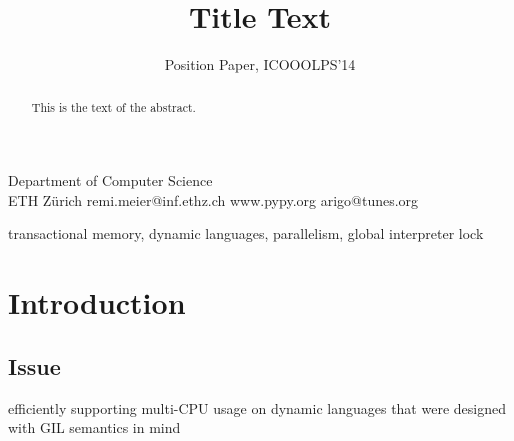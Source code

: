 \documentclass{sigplanconf}
\begin{document}
\setlength{\pdfpageheight}{\paperheight}
\setlength{\pdfpagewidth}{\paperwidth}






\title{Title Text}
\subtitle{Position Paper, ICOOOLPS'14}

           {Department of Computer Science\\ ETH Zürich}
           {remi.meier@inf.ethz.ch}
           {www.pypy.org}
           {arigo@tunes.org}

\maketitle

\begin{abstract}
This is the text of the abstract.
\end{abstract}



\keywords
transactional memory, dynamic languages, parallelism, global interpreter lock

\section{Introduction}

\subsection*{Issue}
efficiently supporting multi-CPU usage on dynamic languages that were designed with GIL semantics in
mind
\end{document}
